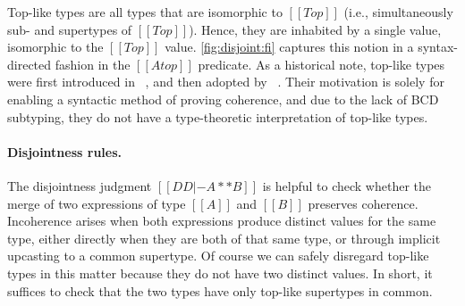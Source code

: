 Top-like types are all types that are isomorphic to $[[Top]]$ (i.e.,
simultaneously sub- and supertypes of $[[Top]]$). Hence, they are inhabited by a
single value, isomorphic to the $[[Top]]$ value. \cref{fig:disjoint:fi} captures
this notion in a syntax-directed fashion in the $[[A top]]$ predicate. As a
historical note, top-like types were first introduced in
\oname~\cite{oliveira2016disjoint}, and then adopted by \fname~\cite{alpuimdisjoint}. Their motivation
is solely for enabling a syntactic method of proving coherence, and due to the
lack of BCD subtyping, they do not have a type-theoretic interpretation of
top-like types.






\paragraph{Disjointness rules.}


The disjointness judgment $[[DD |- A ** B]]$ is helpful to check whether the merge of two
expressions of type $[[A]]$ and $[[B]]$ preserves coherence. Incoherence
arises when both expressions produce distinct values for the same type, either
directly when they are both of that same type, or through implicit upcasting to
a common supertype. Of course we can safely disregard top-like types in this matter
because they do not have two distinct values. In short, it suffices to check that the
two types have only top-like supertypes in common.

